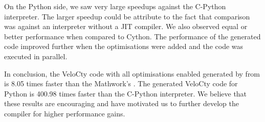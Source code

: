 On the Python side, we saw very large speedups against the C-Python interpreter. The larger speedup could be attribute to the fact that comparison was against an interpreter without a JIT compiler. We also observed equal or better performance when compared to Cython. The performance of the generated code improved further when the optimisations were added and the code was executed in parallel. 

In conclusion, the VeloCty code with all optimisations enabled generated by \velocty from \matlab is 8.05 times faster than the Mathwork's \matlab. The generated VeloCty code for Python is 400.98 times faster than the C-Python interpreter. We believe that these results are encouraging and have motivated us to further develop the compiler for higher performance gains. 
